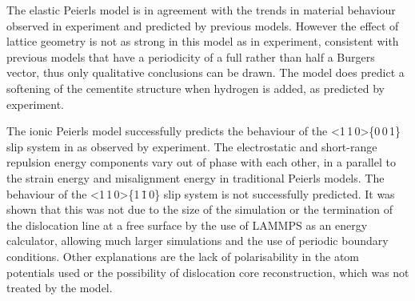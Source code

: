 The elastic Peierls model is in agreement with the trends in material behaviour observed in experiment and predicted by previous models. However the effect of lattice geometry is not as strong in this model as in experiment, consistent with previous models that have a periodicity of a full rather than half a Burgers vector, thus only qualitative conclusions can be drawn. The model does predict a softening of the cementite structure when hydrogen is added, as predicted by experiment.

The ionic Peierls model successfully predicts the behaviour of the <1\,1\,0>\{0\,0\,1\} slip system in  as observed by experiment. The electrostatic and short-range repulsion energy components vary out of phase with each other, in a parallel to the strain energy and misalignment energy in traditional Peierls models. The behaviour of the <1\,1\,0>\{1\,\={1}\,0\} slip system is not successfully predicted. It was shown that this was not due to the size of the simulation or the termination of the dislocation line at a free surface by the use of LAMMPS as an energy calculator, allowing much larger simulations and the use of periodic boundary conditions. Other explanations are the lack of polarisability in the atom potentials used or the possibility of dislocation core reconstruction, which was not treated by the model.





















